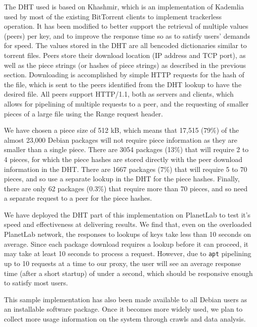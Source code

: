 \documentclass[conference]{IEEEtran}
\begin{document}
The DHT used is based on Khashmir, which is an implementation of
Kademlia \cite{kademlia} used by most of the existing BitTorrent
clients to implement trackerless operation. It has been modified to
better support the retrieval of multiple values (peers) per key, and to
improve the response time so as to satisfy users' demands for speed.
The values stored in the DHT are all bencoded dictionaries similar
to torrent files. Peers store their download location (IP address
and TCP port), as well as the piece strings (or hashes of piece
strings) as described in the previous section. Downloading is
accomplished by simple HTTP requests for the hash of the file,
which is sent to the peers identified from the DHT lookup to
have the desired file. All peers support HTTP/1.1, both as
servers and clients, which allows for pipelining of multiple
requests to a peer, and the requesting of smaller pieces of a large
file using the Range request header.

We have chosen a piece size of 512 kB, which means that 17,515
(79\%) of the almost 23,000 Debian packages will not require piece
information as they are smaller than a single piece. There are 3054
packages (13\%) that will require 2 to 4 pieces, for which the piece
hashes are stored directly with the peer download information in the
DHT. There are 1667 packages (7\%) that will require 5 to 70 pieces,
and so use a separate lookup in the DHT for the piece hashes.
Finally, there are only 62 packages (0.3\%) that require more than
70 pieces, and so need a separate request to a peer for the
piece hashes.

We have deployed the DHT part of this implementation on PlanetLab to
test it's speed and effectiveness at delivering results. We find
that, even on the overloaded PlanetLab network, the responses to
lookups of keys take less than 10 seconds on average. Since each
package download requires a lookup before it can proceed, it may
take at least 10 seconds to process a request. However, due to
\texttt{apt} pipelining up to 10 requests at a time to our proxy,
the user will see an average response time (after a short startup)
of under a second, which should be responsive enough to satisfy most
users.

This sample implementation has also been made available to all
Debian users as an installable software package. Once it becomes
more widely used, we plan to collect more usage information on the
system through crawls and data analysis.



\end{document}
